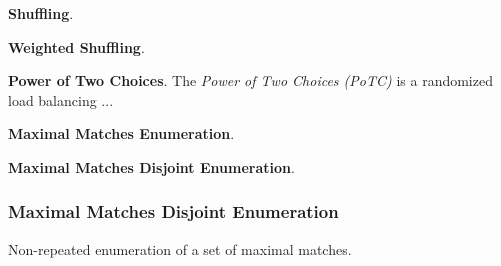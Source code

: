 \textbf{Shuffling}.

\textbf{Weighted Shuffling}.

\textbf{Power of Two Choices}. The \emph{Power of Two Choices (PoTC)} \cite{load-balancing-1} is a randomized load balancing ...

\textbf{Maximal Matches Enumeration}.

\textbf{Maximal Matches Disjoint Enumeration}.

\subsubsection{Maximal Matches Disjoint Enumeration}\label{subsubsec:mmde}

\begin{algorithm}[H]
  \DontPrintSemicolon
  \SetAlgoNoEnd %
  \SetAlgoNoLine %
  \LinesNumbered

  \;
\caption{Non-repeated enumeration of a set of maximal matches.}
\label{algo:mmde}
\end{algorithm}

